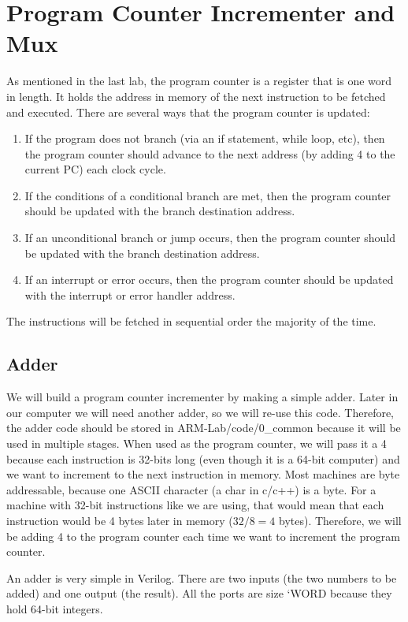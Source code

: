 \chapter{Program Counter Incrementer and Mux}

As mentioned in the last lab, the program counter is a register that is one word in length.  It holds the address in memory of the next instruction to be fetched and executed.  There are several ways that the program counter is updated:  
\begin{enumerate}
	\item If the program does not branch (via an if statement, while loop, etc), then the program counter should advance to the next address (by adding 4 to the current PC) each clock cycle.
	\item If the conditions of a conditional branch are met, then the program counter should be updated with the branch destination address.
	\item If an unconditional branch or jump occurs, then the program counter should be updated with the branch destination address.
	\item If an interrupt or error occurs, then the program counter should be updated with the interrupt or error handler address.
\end{enumerate}
The instructions will be fetched in sequential order the majority of the time.

\section{Adder}

We will build a program counter incrementer by making a simple adder.  Later in our computer we will need another adder, so we will re-use this code.  Therefore, the adder code should be stored in ARM-Lab/code/0\_common because it will be used in multiple stages.  When used as the program counter, we will pass it a 4 because each instruction is 32-bits long (even though it is a 64-bit computer) and we want to increment to the next instruction in memory.  Most machines are byte addressable, because one ASCII character (a char in c/c++) is a byte.  For a machine with 32-bit instructions like we are using, that would mean that each instruction would be 4 bytes later in memory ($32/8=4$ bytes).  Therefore, we will be adding 4 to the program counter each time we want to increment the program counter.

An adder is very simple in Verilog.  There are two inputs (the two numbers to be added) and one output (the result).   All the ports are size `WORD because they hold 64-bit integers.  

